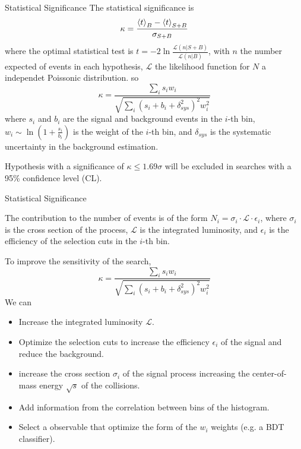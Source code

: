 \documentclass{../../bredelebeamer}
\begin{document}
\begin{frame}{Statistical Significance}
    The statistical significance is 
    \begin{equation}
        \kappa = \frac{\Braket{t}_{B} - \Braket{t}_{S+B}}{\sigma_{S+B}}
    \end{equation}
    where the optimal statistical test is $t=-2\ln \frac{\mathcal{L}(n|S+B)}{\mathcal{L}(n|B)}$, with $n$ the number expected of events in each hypothesis, $\mathcal{L}$ the likelihood function for $N$ a independet Poissonic distribution. so
    \begin{equation}
        \kappa = \frac{\sum_i s_i w_i}{\sqrt{\sum_i (s_i + b_i + \delta_{sys}^2)^2 w_i^2}}
    \end{equation}
    where $s_i$ and $b_i$ are the signal and background events in the $i$-th bin, $w_i\sim \ln (1+\frac{s_i}{b_i})$ is the weight of the $i$-th bin, and $\delta_{sys}$ is the systematic uncertainty in the background estimation.

    Hypothesis with a significance of $\kappa \leq 1.69\sigma$ will be excluded in searches with a 95\% confidence level (CL).
\end{frame}


\begin{frame}{Statistical Significance}
    

    The contribution to the number of events is of the form $N_i = \sigma_i \cdot \mathcal{L} \cdot \epsilon_i$, where $\sigma_i$ is the cross section of the process, $\mathcal{L}$ is the integrated luminosity, and $\epsilon_i$ is the efficiency of the selection cuts in the $i$-th bin.

    To improve the sensitivity of the search, 
    \begin{equation}
        \kappa = \frac{\sum_i s_i w_i}{\sqrt{\sum_i (s_i + b_i + \delta_{sys}^2)^2 w_i^2}}
    \end{equation}
    We can
    \begin{itemize}
        \item Increase the integrated luminosity $\mathcal{L}$.
        \item Optimize the selection cuts to increase the efficiency $\epsilon_i$ of the signal and reduce the background.
        \item increase the cross section $\sigma_i$ of the signal process increasing the center-of-mass energy $\sqrt{s}$ of the collisions.
        \item Add information from the correlation between bins of the histogram.
        \item Select a observable that optimize the form of the $w_i$ weights (e.g. a BDT classifier).
    \end{itemize}
    
\end{frame}
\end{document}
